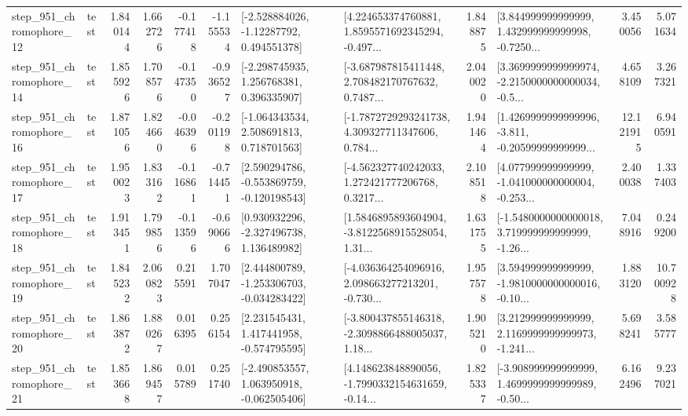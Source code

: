 \begin{tabular}{llrrrrllrlrr}
  step\_951\_chromophore\_12 &      test &      1.840144 &    1.662726 &     -0.177418 & -1.155534 &    [-2.528884026, -1.12287792, 0.494551378] &  [4.224653374760881, 1.8595571692345294, -0.497... &       1.848875 &  [3.844999999999999, 1.432999999999998, -0.7250... &            3.450056 &          5.071634 \\
  step\_951\_chromophore\_14 &      test &      1.855926 &    1.708576 &     -0.147350 & -0.936527 &    [-2.298745935, 1.256768381, 0.396335907] &  [-3.687987815411448, 2.708482170767632, 0.7487... &       2.040020 &  [3.3699999999999974, -2.2150000000000034, -0.5... &            4.658109 &          3.267321 \\
  step\_951\_chromophore\_16 &      test &      1.871056 &    1.824660 &     -0.046396 & -0.201198 &    [-1.064343534, 2.508691813, 0.718701563] &  [-1.7872729293241738, 4.309327711347606, 0.784... &       1.941464 &  [1.4269999999999996, -3.811, -0.20599999999999... &           12.121915 &          6.940591 \\
  step\_951\_chromophore\_17 &      test &      1.950023 &    1.833162 &     -0.116861 & -0.714451 &   [2.590294786, -0.553869759, -0.120198543] &  [-4.562327740242033, 1.272421777206768, 0.3217... &       2.108518 &  [4.077999999999999, -1.041000000000004, -0.253... &            2.400038 &          1.337403 \\
  step\_951\_chromophore\_18 &      test &      1.913451 &    1.799856 &     -0.113596 & -0.690666 &    [0.930932296, -2.327496738, 1.136489982] &  [1.5846895893604904, -3.8122568915528054, 1.31... &       1.631755 &  [-1.5480000000000018, 3.719999999999999, -1.26... &            7.048916 &          0.249200 \\
  step\_951\_chromophore\_19 &      test &      1.845232 &    2.060823 &      0.215591 &  1.707047 &   [2.444800789, -1.253306703, -0.034283422] &  [-4.036364254096916, 2.098663277213201, -0.730... &       1.957578 &  [3.594999999999999, -1.9810000000000016, -0.10... &            1.883120 &         10.700928 \\
  step\_951\_chromophore\_20 &      test &      1.863872 &    1.880267 &      0.016395 &  0.256154 &    [2.231545431, 1.417441958, -0.574795595] &  [-3.800437855146318, -2.3098866488005037, 1.18... &       1.905210 &  [3.212999999999999, 2.1169999999999973, -1.241... &            5.698241 &          3.585777 \\
  step\_951\_chromophore\_21 &      test &      1.853668 &    1.869457 &      0.015789 &  0.251740 &   [-2.490853557, 1.063950918, -0.062505406] &  [4.148623848890056, -1.7990332154631659, -0.14... &       1.825337 &  [-3.908999999999999, 1.4699999999999989, -0.50... &            6.162496 &          9.237021 \\

\end{tabular}
